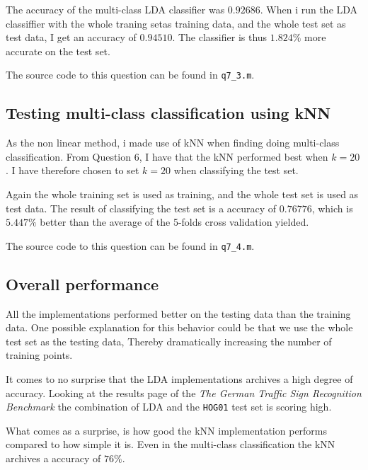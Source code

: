 \documentclass[10pt]{article}
\begin{document}
The accuracy of the multi-class LDA classifier was $0.92686$. When i run the LDA classiffier with the whole traning setas training data, and the whole test set as test data, I get an accuracy of $0.94510$. The classifier is thus $1.824\%$ more accurate on the test set.

The source code to this question can be found in \texttt{q7\_3.m}.


\subsection*{Testing multi-class classification using kNN} %
\label{sub:testing_multi_class_classification_using_knn}
As the non linear method, i made use of kNN when finding doing multi-class classification. From Question 6, I have that the kNN performed best when $k=20$. I have therefore chosen to set $k=20$ when classifying the test set. 

Again the whole training set is used as training, and the whole test set is used as test data. The result of classifying the test set is a accuracy of $0.76776$, which is $5.447\%$ better than the average of the 5-folds cross validation yielded.  

The source code to this question can be found in \texttt{q7\_4.m}.

\subsection*{Overall performance} %
\label{sub:overall_performance}

All the implementations performed better on the testing data than the training data. One possible explanation for this behavior could be that we use the whole test set as the testing data, Thereby dramatically increasing the number of training points.

It comes to no surprise that the LDA implementations archives a high degree of accuracy. Looking at the results page of the \emph{The German Traffic Sign Recognition Benchmark}\cite{resultsURL} the combination of LDA and the \texttt{HOG01} test set is scoring high.

What comes as a surprise, is how good the kNN implementation performs compared to how simple it is. Even in the multi-class classification the kNN archives a accuracy of $76\%$.
\end{document}
